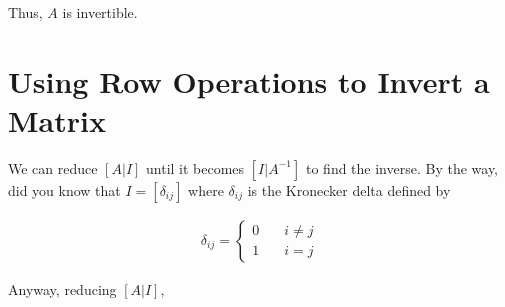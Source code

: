 Thus, $A$ is invertible.

\section{Using Row Operations to Invert a Matrix}

We can reduce $[A | I]$ until it becomes $[I | A^{-1}]$ to find the inverse.
By the way, did you know that $I = [\delta_{ij}]$ where $\delta_{ij}$ is the Kronecker delta defined by

\begin{align*}
  \delta_{ij} =
  \begin{cases}
    0 & \quad i \neq j\\
    1 & \quad i = j
  \end{cases}
\end{align*}

Anyway, reducing $[A | I]$,

